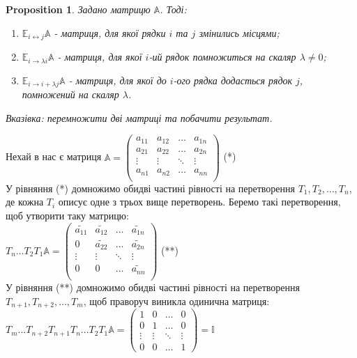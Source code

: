 \documentclass[a4paper, 10pt]{article}
\theoremstyle{theoremdd}
\newtheorem{proposition}[theorem]{Proposition}
\begin{document}
\begin{proposition}
Задано матрицю $\mathbb{A}$. Тоді:
\begin{enumerate}[nosep, label={\arabic*)}, wide=0pt]
	\item $\mathbb{E}_{i \leftrightarrow j}\mathbb{A}$ - матриця, для якої рядки $i$ та $j$ змінились місцями;
	\item $\mathbb{E}_{i \rightarrow \lambda i}\mathbb{A}$ - матриця, для якої $i$-ий рядок помножиться на скаляр $\lambda \neq 0$;
	\item $\mathbb{E}_{i \rightarrow i + \lambda j}\mathbb{A}$ - матриця, для якої до $i$-ого рядка додасться рядок $j$, помножений на скаляр $\lambda$.
\end{enumerate}
	\textit{Вказівка: перемножити дві матриці та побачити результат.}
\end{proposition}
\noindent
Нехай в нас є матриця $\mathbb{A} = \begin{pmatrix}
a_{11} & a_{12} & \dots & a_{1n} \\
a_{21} & a_{22} & \dots & a_{2n} \\
\vdots & \vdots & \ddots & \vdots \\
a_{n1} & a_{n2} & \dots & a_{nn} \\
\end{pmatrix}$ (*) \\
У рівняння (*) домножимо обидві частині рівності на перетворення $T_1,T_2, \dots, T_n$, де кожна $T_i$ описує одне з трьох вище перетворень. Беремо такі перетворення, щоб утворити таку матрицю:\\
$T_n \dots T_2 T_1 \mathbb{A} = \begin{pmatrix}
\tilde{a_{11}} & \tilde{a_{12}} & \dots & \tilde{a_{1n}} \\
0 & \tilde{a_{22}} & \dots & \tilde{a_{2n}} \\
\vdots & \vdots & \ddots & \vdots \\
0 & 0 & \dots & \tilde{a_{nn}} \\
\end{pmatrix}$ (**) \\
У рівняння (**) домножимо обидві частині рівності на перетворення $T_{n+1}, T_{n+2},\dots, T_m$, щоб праворуч виникла одинична матриця:\\
$T_m \dots T_{n+2} T_{n+1} T_n \dots T_2 T_1 \mathbb{A} = \begin{pmatrix}
1 & 0 & \dots & 0 \\
0 & 1 & \dots & 0 \\
\vdots & \vdots & \ddots & \vdots \\
0 & 0 & \dots & 1
\end{pmatrix} = \mathbb{I}$\\
\end{document}
